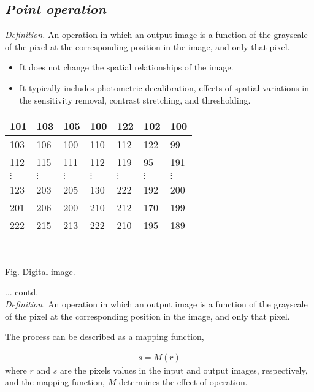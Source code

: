 \documentclass{response}
\begin{document}
\newpage

\subsection*{\Huge\em Point operation }
\bigskip


{\large 

\textit{Definition.} An operation in which an output image is a function of the grayscale of the pixel at the corresponding position in the image, and only that pixel.

\begin{itemize}\setlength\itemsep{-0.5em}
\item It does not change the spatial relationships of the image.
\item It typically includes photometric decalibration, effects of spatial variations in the sensitivity removal, contrast stretching, and thresholding. 
\end{itemize}
%

\hspace{1cm} {
\renewcommand{\tabcolsep}{0.1em}
\begin{tabular}{|l|l|l|l|l|l|l|}
\hline
101 & 103 & 105 & 100 & 122 & 102 & 100 \\ \hline
103 & 106 & 100 & 110 & 112 & 122 & 99 \\ \hline
112 & 115 & 111 & 112 & 119 & 95 & 191 \\ \hline
$\vdots$ & $\vdots$  & $\vdots$  & $\vdots$  & $\vdots$  & $\vdots$ & $\vdots$ \\
123 & 203 & 205 & 130 & 222 & 192 & 200 \\ \hline
201 & 206 & 200 & 210 & 212 & 170 & 199 \\ \hline
222 & 215 & 213 & 222 & 210 & 195 & 189 \\ \hline
\end{tabular}
\mbox{}\\[10pt]
}
\hspace*{1cm }Fig. Digital image.


\newpage

... contd.\\

\textit{Definition.} An operation in which an output image is a function of the grayscale of the pixel at the corresponding position in the image, and only that pixel.

The process can be described as a mapping function, 

\begin{eqnarray}\nonumber
&s = M(r) & 
\end{eqnarray}
where $r$ and $s$ are the pixels values in the input and output images, respectively, and the mapping function, $M$ determines the effect of operation.


}
\end{document}
